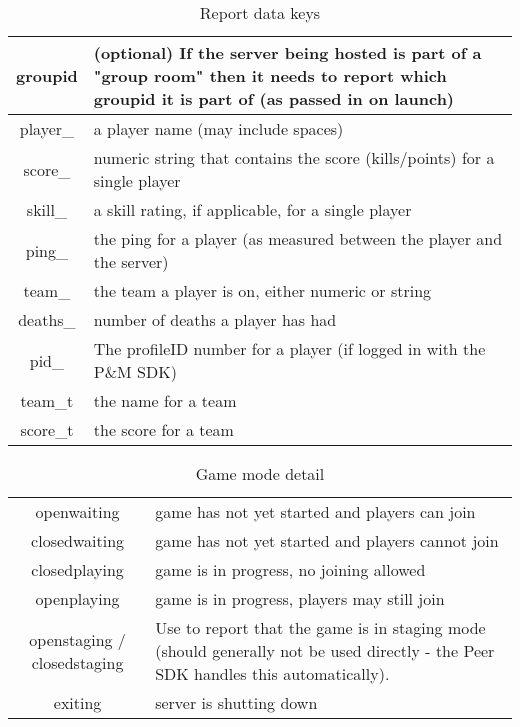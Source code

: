 \documentclass[oneside,titlepage,a4paper]{Definition/retrospy} %
\begin{document}
\begin{table}[H]
\begin{tabular}{C}
		groupid &
		(optional) If the server being hosted is part of a "group room" then it needs to report which groupid it is part of (as passed in on launch) \\\hline
		player\_ &
		a player name (may include spaces) \\\hline
		score\_ &
		numeric string that contains the score (kills/points) for a single player \\\hline
		skill\_ &
		a skill rating, if applicable, for a single player \\\hline
		ping\_ &
		the ping for a player (as measured between the player and the server) \\\hline
		team\_ &
		the team a player is on, either numeric or string \\\hline
		deaths\_ &
		number of deaths a player has had \\\hline
		pid\_ &
		The profileID number for a player (if logged in with the P\&M SDK) \\\hline
		team\_t &
		the name for a team \\\hline
		score\_t &
		the score for a team \\\hline
		
		
		
	\end{tabular}
\caption{Report data keys}
\label{Report data keys}
\end{table}

\begin{table}[H]
	\centering
	\begin{tabular}{C}
		\hline
		&\\\hline
		openwaiting&game has not yet started and players can join \\\hline
		closedwaiting& game has not yet started and players cannot join \\\hline
		closedplaying &game is in progress, no joining allowed \\\hline
		openplaying &game is in progress, players may still join \\\hline
		openstaging / closedstaging&
		Use to report that the game is in staging mode (should generally not be used directly - the Peer SDK handles this automatically). \\\hline
		exiting &server is shutting down \\\hline
	\end{tabular}
\caption{Game mode detail}
\label{Game mode detail}
\end{table}
\end{document}

